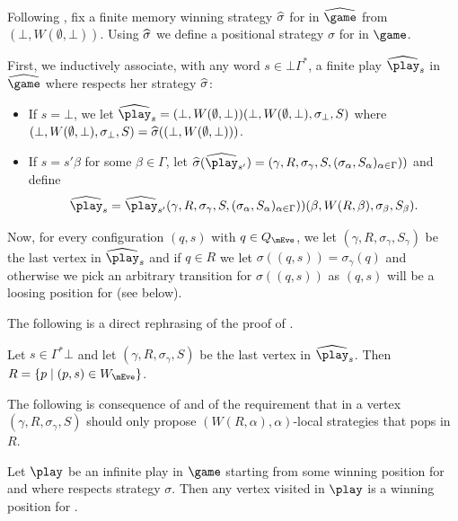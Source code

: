 Following , fix a finite memory winning strategy $\widehat{\sigma}$ for \Eve in $\hgame$ from $(\bot,W(\emptyset,\bot))$. Using $\widehat{\sigma}$ we define a positional strategy $\sigma$ for \Eve in $\game$. 

First, we inductively associate, with any word $s\in \bot \Gamma^*$, a finite play $\hplay_s$ in $\hgame$ where \Eve respects her strategy $\widehat{\sigma}$: 
\begin{itemize}
	\item If $s=\bot$, we let $\hplay_s = (\bot,W(\emptyset,\bot))(\bot,W(\emptyset,\bot),\sigma_\bot,S)$ where $(\bot,W(\emptyset,\bot),\sigma_\bot,S) = \widehat{\sigma}((\bot,W(\emptyset,\bot)))$.
	\item If $s=s'\beta$ for some $\beta\in\Gamma$, let $\hsigma(\hplay_{s'}) = (\gamma,R,\sigma_\gamma,S,(\sigma_\alpha,S_\alpha)_{\alpha\in\Gamma}))$ and define $$\hplay_{s}= \hplay_{s'}(\gamma,R,\sigma_\gamma,S,(\sigma_\alpha,S_\alpha)_{\alpha\in\Gamma}))(\beta,W(R,\beta),\sigma_\beta,S_\beta).$$
\end{itemize}

Now, for every configuration $(q,s)$ with $q\in Q_\mEve$, we let $(\gamma,R,\sigma_\gamma,S_\gamma)$ be the last vertex in $\hplay_s$ and if $q\in R$ we let $\sigma((q,s)) = \sigma_\gamma(q)$ and otherwise we pick an arbitrary transition for $\sigma((q,s))$ as $(q,s)$ will be a loosing position for \Eve (see  below).

The following is a direct rephrasing of the proof of .

\begin{proposition}\label{10-proposition:R-winning-states}
Let $s\in\Gamma^*\bot$ and let $(\gamma,R,\sigma_\gamma,S)$ be the last vertex in $\hplay_s$. Then $R=\{p\mid (p,s)\in W_\mEve\}$.
\end{proposition}

The following is  consequence of  and of the requirement that in a vertex $(\gamma,R,\sigma_\gamma,S)$ \Eve should only propose $(W(R,\alpha),\alpha)$-local strategies that pops in $R$.

\begin{proposition}\label{10-proposition:stays-in-winning-region}
Let $\play$ be an infinite play in $\game$ starting from some winning position for \Eve and where \Eve respects strategy $\sigma$. Then any vertex visited in $\play$ is a winning position for \Eve.
\end{proposition}

